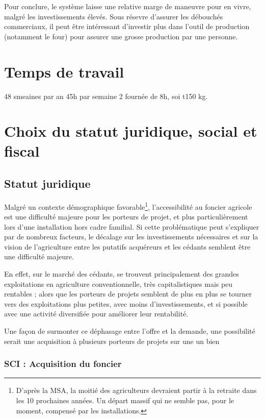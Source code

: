 \documentclass{book}
\begin{document}
Pour conclure, le système laisse une relative marge de maneuvre pour en vivre, malgré les investissements élevés. Sous résevre d'assurer les débouchés commerciaux, il peut être intéressant d'investir plus dans l'outil de production (notamment le four) pour assurer une grosse production par une personne.  

\section{Temps de travail}
\label{part:tps_travail}

48 smeaines par an
45h par semaine
2 fournée de 8h, soi t150 kg.

\section{Choix du statut juridique, social et fiscal}

\subsection{Statut juridique}

Malgré un contexte démographique favorable\footnote{D'après la MSA, la moitié des agriculteurs devraient partir à la retraite dans les 10 prochaines années. Un départ massif qui ne semble pas, pour le moment, compensé par les installations.}, l'accessibilité au foncier agricole est une difficulté majeure pour les porteurs de projet, et plus particulièrement lors d'une installation hors cadre familial. Si cette problématique peut s'expliquer par de nombreux facteurs, le décalage sur les investissements nécessaires et sur la vision de l'agriculture entre les putatifs acquéreurs et les cédants semblent être une difficulté majeure. 

En effet, sur le marché des cédants, se trouvent principalement des grandes exploitations en agriculture conventionnelle, très capitalistiques mais peu rentables ; alors que les porteurs de projets semblent de plus en plus se tourner vers des exploitations plus petites, avec moins d'investissements, et si possible avec une activité diversifiée pour améliorer leur rentabilité. 

Une façon de surmonter ce déphasage entre l'offre et la demande, une possibilité serait une acquisition à plusieurs porteurs de projets sur une un bien

\subsubsection{SCI : Acquisition du foncier}
\label{part:SCI}
\end{document}
